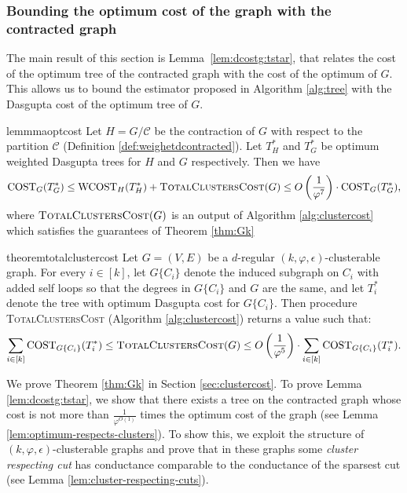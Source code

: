 \documentclass[letterpaper,11pt]{article}
\newcommand{\CT}{\text{COST}}
\newcommand{\wCT}{\text{WCOST}}
\newcommand{\cC}{\mathcal{C}}
\theoremstyle{plain}
\theoremstyle{definition}
\theoremstyle{remark}
\newcommand{\e}{\epsilon}
\begin{document}
\subsubsection{Bounding the optimum cost of the graph with the contracted graph} \label{sec:opt:contracted:cost}

The main result of this section is Lemma~\ref{lem:dcostg:tstar}, that relates the cost of the optimum tree of the contracted graph with the cost of the optimum of $G$. This allows us to bound the estimator proposed in Algorithm \ref{alg:tree} with the Dasgupta cost of the optimum tree of $G$.



\begin{restatable}{lemmma}{optcost} \label{lem:dcostg:tstar}
Let $H = G/\cC$ be the contraction of $G$ with respect to the partition $\cC $ (Definition \ref{def:weighetdcontracted}). Let $T^*_H$ and $T^*_G$ be optimum weighted Dasgupta trees for $H$ and $G$ respectively. Then we have
\[ \CT_G(T^*_G) \leq \wCT_H(T^*_H) + \textsc{TotalClustersCost}(G) \leq O\left(\frac{1}{\varphi^7}\right) \cdot \CT_G(T^*_G) \text{,}\]
where $\textsc{TotalClustersCost}(G)$ is an output of Algorithm \ref{alg:clustercost} which satisfies the guarantees of Theorem \ref{thm:Gk}
\end{restatable}

\begin{restatable}{theorem}{totalclustercost}
\label{thm:Gk}
Let $G=(V,E)$ be a $d$-regular $(k,\varphi,\epsilon)$-clusterable graph. For every $i\in[k]$, let $G\{C_i\}$ denote the induced subgraph on $C_i$ with added self loops so that the degrees in $G\{C_i\}$ and $G$ are the same, and let $T^*_i$ denote the tree
	with optimum Dasgupta cost for $G\{C_i\}$. 
Then procedure \textsc{TotalClustersCost} (Algorithm \ref{alg:clustercost}) returns a value such that:
\[\sum_{i \in [k]} \CT_{G\{C_i\}}(T^*_i) \leq \textsc{TotalClustersCost}(G) \leq O\left(\frac{1}{\varphi^{5}}\right)\cdot \sum_{i \in [k]} \CT_{G\{C_i\}}(T^*_i) \text{.} \]
\end{restatable} 
We prove Theorem \ref{thm:Gk} in Section \ref{sec:clustercost}. 
To prove Lemma \ref{lem:dcostg:tstar}, we show that there exists a tree on the contracted graph whose cost is not more than $\frac{1}{\varphi^{O(1)}}$ times the optimum cost of the graph (see Lemma \ref{lem:optimum-respects-clusters}). To show this, we exploit the structure of $(k, \varphi, \e)$-clusterable graphs and prove that in these graphs some {\em cluster respecting cut} has conductance comparable to the conductance of the sparsest cut (see Lemma \ref{lem:cluster-respecting-cuts}).
\end{document}
